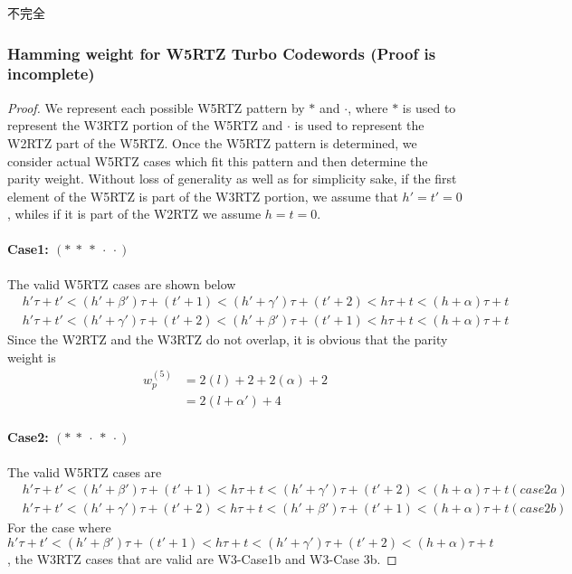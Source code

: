 不完全
\subsubsection{Hamming weight for W5RTZ Turbo Codewords (Proof is incomplete)}
\begin{proof}
We represent each possible W5RTZ pattern by $*$ and $\cdot$, where $*$ is used to represent the W3RTZ portion of the W5RTZ and $\cdot$ is used to represent the W2RTZ part of the W5RTZ. Once the W5RTZ pattern is determined, we consider actual W5RTZ cases which fit this pattern and then determine the parity weight. Without loss of generality as well as for simplicity sake, if the first element of the W5RTZ is part of the W3RTZ portion, we assume that $h'=t'=0$, whiles if it is part of the W2RTZ we assume $h=t=0$.

\paragraph{Case1: $(*~ *~ *~ \cdot~\cdot )$\newline}
The valid W5RTZ cases are shown below
\begin{eqnarray}
 &h'\tau+t'<(h'+\beta')\tau+(t'+1)<(h'+\gamma')\tau+(t'+2)<h\tau+t<(h+\alpha)\tau+t\\
 &h'\tau+t'<(h'+\gamma')\tau+(t'+2)<(h'+\beta')\tau+(t'+1)<h\tau+t<(h+\alpha)\tau+t
 \end{eqnarray}
Since the W2RTZ and the W3RTZ do not overlap, it is obvious that the 
parity weight is
\begin{equation*}
\begin{split}
w_p^{(5)}&=2(l)+2+2(\alpha)+2\\
&=2(l+\alpha')+4
\end{split}
\end{equation*}

\paragraph{Case2: $(*~*~\cdot~*~\cdot)$  \newline}
The valid W5RTZ cases are 
\begin{eqnarray}
&h'\tau+t'<(h'+\beta')\tau+(t'+1)<h\tau+t<(h'+\gamma')\tau+(t'+2)<(h+\alpha)\tau+t (case2a)\\
&h'\tau+t'<(h'+\gamma')\tau+(t'+2)<h\tau+t<(h'+\beta')\tau+(t'+1)<(h+\alpha)\tau+t (case2b)
\end{eqnarray}
For the case where $h'\tau+t'<(h'+\beta')\tau+(t'+1)<h\tau+t<(h'+\gamma')\tau+(t'+2)<(h+\alpha)\tau+t$, the W3RTZ cases that are valid are W3-Case1b and W3-Case 3b.


\end{proof}
